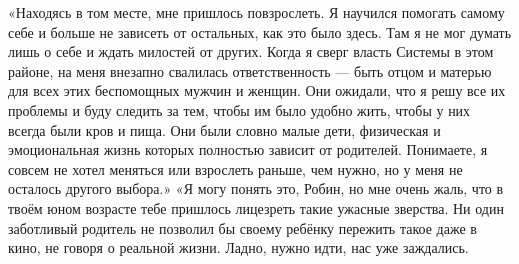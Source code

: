 \documentclass[a4paper,12pt]{book}
\begin{document}
	«Находясь в том месте, мне пришлось повзрослеть. Я научился помогать самому себе и больше не зависеть от остальных, как это было здесь. Там я не мог думать лишь о себе и ждать милостей от других. Когда я сверг власть Системы в этом районе, на меня внезапно свалилась ответственность — быть отцом и матерью для всех этих беспомощных мужчин и женщин. Они ожидали, что я решу все их проблемы и буду следить за тем, чтобы им было удобно жить, чтобы у них всегда были кров и пища. Они были словно малые дети, физическая и эмоциональная жизнь которых полностью зависит от родителей. Понимаете, я совсем не хотел меняться или взрослеть раньше, чем нужно, но у меня не осталось другого выбора.»
	«Я могу понять это, Робин, но мне очень жаль, что в твоём юном возрасте тебе пришлось лицезреть такие ужасные зверства. Ни один заботливый родитель не позволил бы своему ребёнку пережить такое даже в кино, не говоря о реальной жизни. Ладно, нужно идти, нас уже заждались.
\end{document}
